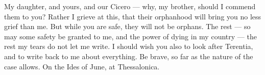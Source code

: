  My daughter, and yours, and our Cicero --- why, my brother, should I commend them to you? Rather I grieve at this, that their orphanhood will bring you no less grief than me. But while you are safe, they will not be orphans. The rest --- so may some safety be granted to me, and the power of dying in my country --- the rest my tears do not let me write. I should wish you also to look after Terentia, and to write back to me about everything. Be brave, so far as the nature of the case allows. On the Ides of June, at Thessalonica.
